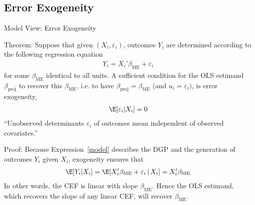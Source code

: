 \documentclass[aspectratio=169, handout]{beamer}
\begin{document}
\subsection{Error Exogeneity}


{\footnotesize
\begin{frame}{Model View: Error Exogeneity}

\alert{Theorem}:
Suppose that given $(X_i,\varepsilon_i)$, outcomes $Y_i$ are determined
according to the following regression equation
\begin{align}
  Y_i = X_i'\beta_{\text{ME}} + \varepsilon_i
  \label{model}
\end{align}
for some $\beta_{\text{ME}}$ identical to all units.
A sufficient condition for the OLS estimand $\beta_{\text{proj}}$ to
recover this $\beta_{\text{ME}}$, i.e. to have
$\beta_{\text{proj}}=\beta_{\text{ME}}$ (and $u_i=\varepsilon_i)$, is
\alert{error exogeneity},
\begin{align*}
  \E[\varepsilon_i|X_i] = 0
\end{align*}
``Unobserved determinants $\varepsilon_i$ of outcomes
\alert{mean independent} of observed covariates.''

\alert{Proof}:
Because Expression~\ref{model} describes the DGP and the generation of
outcomes $Y_i$ given $X_i$, exogeneity ensures that
\begin{align*}
  \E[Y_i|X_i]
  = \E[X_i'\beta_{\text{ME}} + \varepsilon_i\,|\,X_i]
  = X_i'\beta_{\text{ME}}
\end{align*}
In other words, the CEF is linear with slope $\beta_{\text{ME}}$.
Hence the OLS estimand, which recovers the slope of any linear CEF, will
recover $\beta_{\text{ME}}$.
\end{frame}
}
\end{document}
